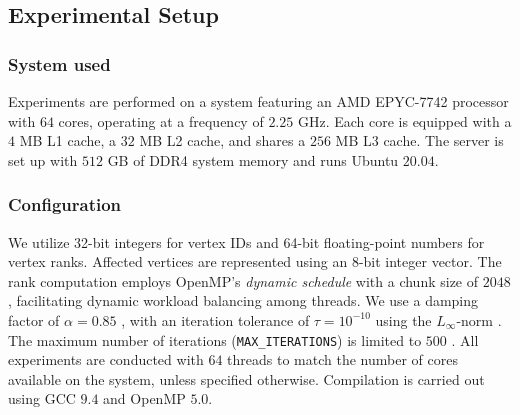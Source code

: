 \subsection{Experimental Setup}
\label{sec:setup}

\subsubsection{System used}

Experiments are performed on a system featuring an AMD EPYC-7742 processor with $64$ cores, operating at a frequency of $2.25$ GHz. Each core is equipped with a $4$ MB L1 cache, a $32$ MB L2 cache, and shares a $256$ MB L3 cache. The server is set up with $512$ GB of DDR4 system memory and runs Ubuntu $20.04$.


\subsubsection{Configuration}

We utilize 32-bit integers for vertex IDs and 64-bit floating-point numbers for vertex ranks. Affected vertices are represented using an 8-bit integer vector. The rank computation employs OpenMP's \textit{dynamic schedule} with a chunk size of $2048$, facilitating dynamic workload balancing among threads. We use a damping factor of $\alpha = 0.85$ \cite{rank-langville06}, with an iteration tolerance of $\tau = 10^{-10}$ using the $L_\infty$-norm \cite{rank-dubey22, rank-plimpton11}. The maximum number of iterations (\texttt{MAX\_ITERATIONS}) is limited to $500$ \cite{nvgraph}. All experiments are conducted with $64$ threads to match the number of cores available on the system, unless specified otherwise. Compilation is carried out using GCC $9.4$ and OpenMP $5.0$.






